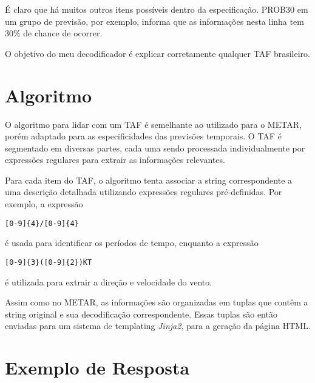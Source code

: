 É claro que há muitos outros itens possíveis dentro da especificação. PROB30 em 
um grupo de previsão, por exemplo, informa que as informações nesta linha tem 
30\% de chance de ocorrer.

O objetivo do meu decodificador é explicar corretamente qualquer TAF brasileiro.


\section{Algoritmo}

O algoritmo para lidar com um TAF é semelhante ao utilizado para o METAR, porém adaptado
para as especificidades das previsões temporais. O TAF é segmentado em diversas
partes, cada uma sendo processada individualmente por expressões regulares para extrair as
informações relevantes.

Para cada item do TAF, o algoritmo tenta associar a string correspondente a uma descrição
detalhada utilizando expressões regulares pré-definidas. Por exemplo, a expressão

\begin{verbatim}
[0-9]{4}/[0-9]{4} 
\end{verbatim}

é usada para identificar os períodos de tempo, enquanto a expressão

\begin{verbatim}
[0-9]{3}([0-9]{2})KT
\end{verbatim}

é utilizada para extrair a direção e velocidade do vento.

Assim como no METAR, as informações são organizadas em tuplas que contêm a string original
e sua decodificação correspondente. Essas tuplas são então enviadas para um sistema de
templating \textit{Jinja2}, para a geração da página HTML.

\section{Exemplo de Resposta}


